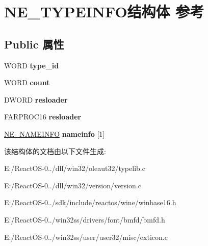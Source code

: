 \hypertarget{struct_n_e___t_y_p_e_i_n_f_o}{}\section{N\+E\+\_\+\+T\+Y\+P\+E\+I\+N\+F\+O结构体 参考}
\label{struct_n_e___t_y_p_e_i_n_f_o}
\subsection*{Public 属性}
\begin{DoxyCompactItemize}
\item 
\mbox{\label{struct_n_e___t_y_p_e_i_n_f_o_a49a6fad09d21f11b6ac32df0738a6d3f}} 
W\+O\+RD {\bfseries type\+\_\+id}
\item 
\mbox{\label{struct_n_e___t_y_p_e_i_n_f_o_a53c74820c7faa2fb008dba21db823f80}} 
W\+O\+RD {\bfseries count}
\item 
\mbox{\label{struct_n_e___t_y_p_e_i_n_f_o_af799246548e2e78e595b3edf77df4057}} 
D\+W\+O\+RD {\bfseries resloader}
\item 
\mbox{\label{struct_n_e___t_y_p_e_i_n_f_o_a6daf19e102a3b07c2302ddec3cba5e08}} 
F\+A\+R\+P\+R\+O\+C16 {\bfseries resloader}
\item 
\mbox{\label{struct_n_e___t_y_p_e_i_n_f_o_a067c73b832ed0953077564db277b5af9}} 
\hyperlink{struct_n_e___n_a_m_e_i_n_f_o}{N\+E\+\_\+\+N\+A\+M\+E\+I\+N\+FO} {\bfseries nameinfo} \mbox{[}1\mbox{]}
\end{DoxyCompactItemize}


该结构体的文档由以下文件生成\+:\begin{DoxyCompactItemize}
\item 
E\+:/\+React\+O\+S-\/0../dll/win32/oleaut32/typelib.\+c\item 
E\+:/\+React\+O\+S-\/0../dll/win32/version/version.\+c\item 
E\+:/\+React\+O\+S-\/0../sdk/include/reactos/wine/winbase16.\+h\item 
E\+:/\+React\+O\+S-\/0../win32ss/drivers/font/bmfd/bmfd.\+h\item 
E\+:/\+React\+O\+S-\/0../win32ss/user/user32/misc/exticon.\+c\end{DoxyCompactItemize}

